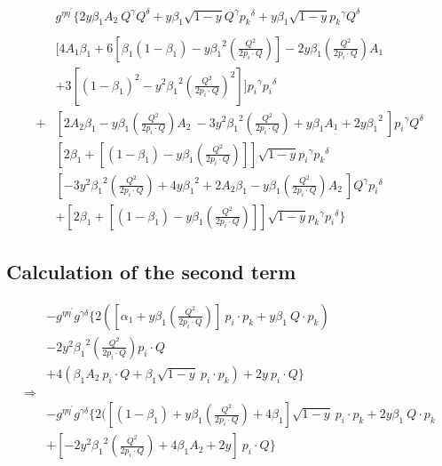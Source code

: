 \begin{equation}
\begin{split} 
& g^{{{\eta}}{{\eta}^{\prime}}}\lbrace 2y {\beta_1} A_2 \:{Q}^{{\gamma}}{Q}^{{\delta}}+y {\beta_1}\sqrt{1-y}{Q}^{{\gamma}}{{p_k}^{{\delta}}} +y {\beta_1}\sqrt{1-y}{p_k}^{{\gamma}}{{Q}^{{\delta}}} \\
\\
&[4 A_1\beta_1+6[\beta_1(1-\beta_1)-y {\beta_1}^2 (\frac{Q^2}{2p_i \cdot Q})]-2y {\beta_1} (\frac{Q^2}{2p_i \cdot Q}) A_1\\
&+3 [(1-\beta_1)^2-y^2 {\beta_1}^2 (\frac{Q^2}{2p_i \cdot Q})^2]]{p_i}^{{\gamma}}{{p_i}^{{\delta}}}\\+
& [2 A_2\beta_1-y {\beta_1} (\frac{Q^2}{2p_i \cdot Q}) A_2\:-3y^2 {\beta_1}^2 (\frac{Q^2}{2p_i \cdot Q})+y {\beta_1} A_1+2y {\beta_1}^2 \:]{p_i}^{{\gamma}}{{Q}^{{\delta}}}\\
& [2 \beta_1 + [(1-\beta_1)-y\beta_1 (\frac{Q^2}{2p_i \cdot Q})]] \sqrt{1-y}{p_i}^{{\gamma}}{{p_k}^{{\delta}}}\\
& [-3y^2 {\beta_1}^2 (\frac{Q^2}{2p_i \cdot Q})+4 y {\beta_1}^2+ 2A_2\beta_1-y {\beta_1} (\frac{Q^2}{2p_i \cdot Q}) A_2\: ]{Q}^{{\gamma}}{p_i}^{{\delta}} \\
&+[2 \beta_1 +[(1-\beta_1)-y\beta_1 (\frac{Q^2}{2p_i \cdot Q})]] \sqrt{1-y}{p_k}^{{\gamma}}{{p_i}^{{\delta}}}\rbrace
\end{split}
\end{equation}

\subsection*{Calculation of the second term}
\begin{equation}
\begin{split}
&-g^{{{\eta}}{{\eta}^{\prime}}}g^{{{\gamma}}{{\delta}}}\lbrace2([\alpha_1 +y\beta_1(\frac{Q^2}{2p_i \cdot Q})]\:p_i \cdot p_k+y\beta_1\:Q\cdot p_k)\\
&-2y^2 {\beta_1}^2 (\frac{Q^2}{2p_i \cdot Q}){p_i}\cdot{Q}\\
&+4(\beta_1 A_2 \:p_i \cdot Q+ \beta_1 \sqrt{1-y}\:p_i \cdot p_k)+2y\:p_i\cdot Q\rbrace\\
\Rightarrow \\
&-g^{{{\eta}}{{\eta}^{\prime}}}g^{{{\gamma}}{{\delta}}}\lbrace2([(1-\beta_1)+y\beta_1(\frac{Q^2}{2p_i \cdot Q})+4 \beta_1] \sqrt{1-y}\:p_i \cdot p_k+2y\beta_1\:Q\cdot p_k\\
&+[-2y^2 {\beta_1}^2 (\frac{Q^2}{2p_i \cdot Q})+4\beta_1 A_2 +2y]\:p_i\cdot Q\rbrace
\end{split}
\end{equation}

